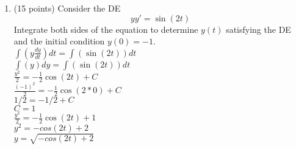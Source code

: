 \documentclass{article}
\begin{document}
\begin{enumerate}
\bigskip
\newpage
\item (15 points) Consider the DE 
\[
yy' = \sin(2t)
\]
Integrate both sides of the equation to determine $y(t)$ satisfying the DE and the initial condition $y(0)=-1$.
\\$\int(y\frac{dy}{dt}) dt =\int(\sin(2t)) dt$
\\$\int(y) dy=\int(\sin(2t))dt$
\\$\frac{y^2}{2}=-\frac{1}{2}\cos(2t)+C$
\\$\frac{(-1)^2}{2}=-\frac{1}{2}\cos(2*0)+C$
\\$1/2=-1/2+C$
\\$C=1$
\\$\frac{y^2}{2}=-\frac{1}{2}\cos(2t)+1$
\\$y^2=-cos(2t)+2$
\\$y=\sqrt{-cos(2t)+2}$

\end{enumerate}
\end{document}
